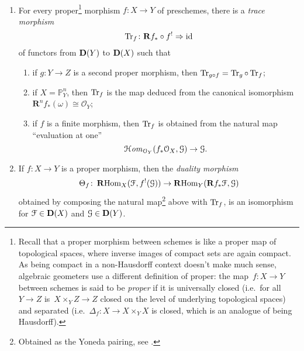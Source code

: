 \begin{theorem} {\ }
\begin{enumerate}
\begin{enumerate}
          \begin{equation}
            f^!(\mathcal{G})=\HHom_{\mathcal{O}_Y}(f_*\mathcal{O}_X,\mathcal{G}).
          \end{equation}
      \end{enumerate}
    \item\label{enumerate:classical-b} For every proper\footnote{Recall that a proper morphism between schemes is like a proper map of topological spaces, where inverse images of compact sets are again compact. As being compact in a non-Hausdorff context doesn't make much sense, algebraic geometers use a different definition of proper: the map~$f\colon X\to Y$ between schemes is said to be \emph{proper} if it is universally closed (i.e.\ for all~$Y\to Z$ is~$X\times_YZ\to Z$ closed on the level of underlying topological spaces) and separated (i.e.~$\Delta_f\colon X\to X\times_YX$ is closed, which is an analogue of being Hausdorff).} morphism $f\colon X\to Y$ of preschemes, there is a \emph{trace morphism}
      \begin{equation}
        \operatorname{Tr}_f\colon\mathbf{R} f_*\circ f^!\Rightarrow\mathrm{id}
      \end{equation}
      of functors from $\mathbf{D}(Y)$ to $\mathbf{D}(X)$ such that
      \begin{enumerate}
        \item\label{enumerate:classical-b-1} if $g\colon Y\to Z$ is a second proper morphism, then $\operatorname{Tr}_{g\circ f}=\operatorname{Tr}_g\circ\operatorname{Tr}_f$;
        \item\label{enumerate:classical-b-2} if $X=\mathbb{P}_Y^n$, then $\operatorname{Tr}_f$ is the map deduced from the canonical isomorphism $\mathbf{R}^nf_*(\omega)\cong\mathcal{O}_Y$;
        \item\label{enumerate:classical-b-3} if $f$ is a finite morphism, then $\operatorname{Tr}_f$ is obtained from the natural map ``evaluation at one''
          \begin{equation}
            \operatorname{\mathcal{H}\mathit{om}}_{\mathcal{O}_Y}(f_*\mathcal{O}_X,\mathcal{G})\to\mathcal{G}.
          \end{equation}
      \end{enumerate}
    \item\label{enumerate:classical-c} If $f\colon X\to Y$ is a proper morphism, then the \emph{duality morphism}
      \begin{equation}
        \label{equation:duality-morphism}
        \Theta_f\colon\operatorname{\mathbf{R}Hom}_X(\mathcal{F},f^!(\mathcal{G}))\to\operatorname{\mathbf{R}Hom}_Y(\mathbf{R}f_*\mathcal{F},\mathcal{G})
      \end{equation}
      obtained by composing the natural map\footnote{Obtained as the Yoneda pairing, see \cite[page 5]{hartshorne-residues-and-duality}.} above with $\operatorname{Tr}_f$, is an isomorphism for $\mathcal{F}\in\mathbf{D}(X)$ and $\mathcal{G}\in\mathbf{D}(Y)$.
  \end{enumerate}
\end{theorem}
